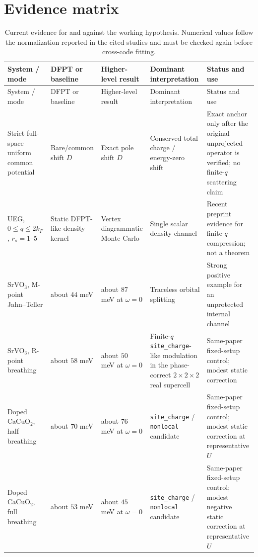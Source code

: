 \section{Evidence matrix}
\label{app:evidence}

\small
\begin{longtable}{@{}p{2.4cm}p{2.55cm}p{2.25cm}p{2.45cm}p{3.2cm}@{}}
\caption{Current evidence for and against the working hypothesis.  Numerical
values follow the normalization reported in the cited studies and must be checked
again before cross-code fitting.}
\label{tab:evidence}\\
\toprule
System / mode & DFPT or baseline & Higher-level result & Dominant interpretation &
Status and use \\
\midrule
\endfirsthead
\toprule
System / mode & DFPT or baseline & Higher-level result & Dominant interpretation &
Status and use \\
\midrule
\endhead
\bottomrule
\endfoot
Strict full-space uniform common potential & Bare/common shift $D$ & Exact pole
shift $D$ & Conserved total charge / energy-zero shift & Exact anchor only after
the original unprojected operator is verified; no finite-$q$ scattering claim \\

UEG, $0\le q\le2k_F$, $r_s=1$--$5$ & Static DFPT-like density kernel &
Vertex diagrammatic Monte Carlo & Single scalar density channel & Recent preprint
evidence for finite-$q$ compression; not a theorem \citep{Cai2025} \\

SrVO$_3$, M-point Jahn--Teller & about $44$ meV & about $87$ meV at $\omega=0$ &
Traceless orbital splitting & Strong positive example for an unprotected internal
channel \citep{Abramovitch2025} \\

SrVO$_3$, R-point breathing & about $58$ meV & about $50$ meV at $\omega=0$ &
Finite-$q$ \texttt{site\_charge}-like modulation in the phase-correct
$2\times2\times2$ real supercell & Same-paper fixed-setup control; modest static correction
\citep{Abramovitch2025} \\

Doped CaCuO$_2$, half breathing & about $70$ meV & about $76$ meV at $\omega=0$ &
\texttt{site\_charge} / \texttt{nonlocal} candidate & Same-paper fixed-setup
control; modest static correction at representative $U$
\citep{Abramovitch2025} \\

Doped CaCuO$_2$, full breathing & about $53$ meV & about $45$ meV at $\omega=0$ &
\texttt{site\_charge} / \texttt{nonlocal} candidate & Same-paper fixed-setup
control; modest negative static correction at
representative $U$ \citep{Abramovitch2025} \\


\end{longtable}
